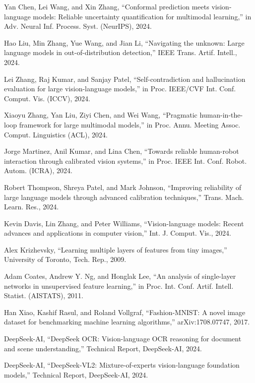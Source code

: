 Yan Chen, Lei Wang, and Xin Zhang, ``Conformal prediction meets vision-language models: Reliable uncertainty quantification for multimodal learning,'' in Adv. Neural Inf. Process. Syst. (NeurIPS), 2024.

Hao Liu, Min Zhang, Yue Wang, and Jian Li, ``Navigating the unknown: Large language models in out-of-distribution detection,'' IEEE Trans. Artif. Intell., 2024.

Lei Zhang, Raj Kumar, and Sanjay Patel, ``Self-contradiction and hallucination evaluation for large vision-language models,'' in Proc. IEEE/CVF Int. Conf. Comput. Vis. (ICCV), 2024.

Xiaoyu Zhang, Yan Liu, Ziyi Chen, and Wei Wang, ``Pragmatic human-in-the-loop framework for large multimodal models,'' in Proc. Annu. Meeting Assoc. Comput. Linguistics (ACL), 2024.

Jorge Martinez, Anil Kumar, and Lina Chen, ``Towards reliable human-robot interaction through calibrated vision systems,'' in Proc. IEEE Int. Conf. Robot. Autom. (ICRA), 2024.

Robert Thompson, Shreya Patel, and Mark Johnson, ``Improving reliability of large language models through advanced calibration techniques,'' Trans. Mach. Learn. Res., 2024.

Kevin Davis, Lin Zhang, and Peter Williams, ``Vision-language models: Recent advances and applications in computer vision,'' Int. J. Comput. Vis., 2024.

Alex Krizhevsky, ``Learning multiple layers of features from tiny images,'' University of Toronto, Tech. Rep., 2009.

Adam Coates, Andrew Y. Ng, and Honglak Lee, ``An analysis of single-layer networks in unsupervised feature learning,'' in Proc. Int. Conf. Artif. Intell. Statist. (AISTATS), 2011.

Han Xiao, Kashif Rasul, and Roland Vollgraf, ``Fashion-MNIST: A novel image dataset for benchmarking machine learning algorithms,'' arXiv:1708.07747, 2017.

DeepSeek-AI, ``DeepSeek OCR: Vision-language OCR reasoning for document and scene understanding,'' Technical Report, DeepSeek-AI, 2024.

DeepSeek-AI, ``DeepSeek-VL2: Mixture-of-experts vision-language foundation models,'' Technical Report, DeepSeek-AI, 2024.
